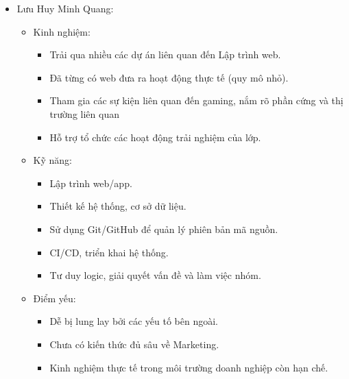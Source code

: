 \begin{itemize}
    \item Lưu Huy Minh Quang:
    \begin{itemize}
        \item Kinh nghiệm:
            \begin{itemize}
                \item Trải qua nhiều các dự án liên quan đến Lập trình web.
                \item Đã từng có web đưa ra hoạt động thực tế (quy mô nhỏ).
                \item Tham gia các sự kiện liên quan đến gaming, nắm rõ phần cứng và thị trường liên quan
                \item Hỗ trợ tổ chức các hoạt động trải nghiệm của lớp.
            \end{itemize}
        \item Kỹ năng:
            \begin{itemize}
                \item Lập trình web/app.
                \item Thiết kế hệ thống, cơ sở dữ liệu.
                \item Sử dụng Git/GitHub để quản lý phiên bản mã nguồn.
                \item CI/CD, triển khai hệ thống.
                \item Tư duy logic, giải quyết vấn đề và làm việc nhóm.
            \end{itemize}
        \item Điểm yếu:
            \begin{itemize}
                \item Dễ bị lung lay bởi các yếu tố bên ngoài.
                \item Chưa có kiến thức đủ sâu về Marketing.
                \item Kinh nghiệm thực tế trong môi trường doanh nghiệp còn hạn chế.
            \end{itemize}
    \end{itemize}
    

\end{itemize}
